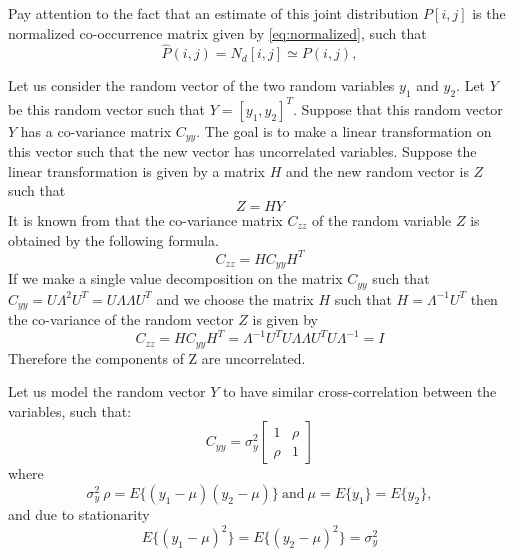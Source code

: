 Pay attention to the fact that an estimate of this joint distribution $P[i,j]$ is the normalized co-occurrence matrix given by \ref{eq:normalized}, such that
\begin{equation}
    \hat{P}(i,j) = N_d[i,j] \simeq P(i,j),
\end{equation}
\newline

Let us consider the random vector of the two random variables $y_1$ and $y_2$. Let $Y$ be this random vector such that $Y=[y_1, y_2]^T$. Suppose that this random vector $Y$ has a co-variance matrix $C_{yy}$. The goal is to make a linear transformation on this vector such that the new vector has uncorrelated variables. Suppose the linear transformation is given by a matrix $H$ and the new random vector is $Z$ such that
\begin{equation}
    Z=HY
\end{equation}{}
It is known from \cite{papoulis} that the co-variance matrix $C_{zz}$ of the random variable $Z$ is obtained by the following formula.
\begin{equation}
    C_{zz} = HC_{yy}H^T
\end{equation}
If we make a single value decomposition on the matrix $C_{yy}$ such that $C_{yy} = U\Lambda^2U^T 
=U\Lambda \Lambda U^T$ and we choose the matrix $H$ such that $H = \Lambda^{-1}U^T$ then the co-variance of the random vector $Z$ is given by
\begin{equation}
    C_{zz} = HC_{yy}H^T = \Lambda^{-1}U^T U\Lambda \Lambda U^T U \Lambda^{-1} = I
\end{equation}{}
Therefore the components of Z are uncorrelated.

Let us model the random vector $Y$ to have similar cross-correlation between the variables, such that:
\begin{equation}
    C_{yy} = \sigma_y^2 
    \begin{bmatrix}
    1&\rho\\
    \rho&1
    \end{bmatrix}
\end{equation}{}
where
\begin{equation}
    \sigma_y^2\ \rho = E\{(y_1-\mu)(y_2-\mu)\} \ \text{and} \ \mu = E\{y_1\} = E\{y_2\},
\end{equation}{}
and due to stationarity 
\begin{equation}
    E\{(y_1-\mu)^2\}=E\{(y_2-\mu)^2\} = \sigma_y^2
\end{equation}{}

